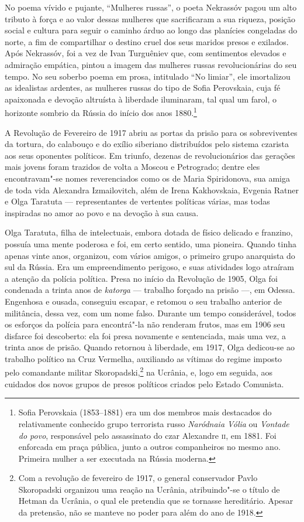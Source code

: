 No poema vívido e pujante, ``Mulheres russas'', o poeta Nekrassóv pagou
um alto tributo à força e ao valor dessas mulheres que sacrificaram a sua
riqueza, posição social e cultura para seguir o caminho árduo ao longo
das planícies congeladas do norte, a fim de compartilhar o destino cruel
dos seus maridos presos e exilados. Após Nekrassóv, foi a vez de Ivan
Turguêniev que, com sentimentos elevados e admiração empática, pintou a
imagem das mulheres russas revolucionárias do seu tempo. No seu soberbo
poema em prosa, intitulado ``No limiar'', ele imortalizou as idealistas
ardentes, as mulheres russas do tipo de Sofia Perovskaia, cuja fé
apaixonada e devoção altruísta à liberdade iluminaram, tal qual um
farol, o horizonte sombrio da Rússia do início dos anos
1880.\footnote{Sofia Perovskaia (1853--1881) era um dos membros mais
  destacados do relativamente conhecido grupo terrorista russo \textit{Naródnaia Vólia} ou \textit{Vontade do povo}, responsável pelo assassinato do czar
  Alexandre \textsc{ii}, em 1881. Foi enforcada em praça pública, junto a outros
  companheiros no mesmo ano. Primeira mulher a ser executada na
  Rússia moderna.}

A Revolução de Fevereiro de 1917 abriu as portas da prisão para os
sobreviventes da tortura, do calabouço e do exílio siberiano
distribuídos pelo sistema czarista aos seus oponentes políticos. Em
triunfo, dezenas de revolucionários das gerações mais jovens foram trazidos de volta a Moscou e Petrogrado;
dentre eles encontravam"-se
nomes reverenciados como os de Maria Spiridonova, sua amiga de toda vida
Alexandra Izmailovitch, além de Irena Kakhovskaia, Evgenia Ratner e Olga Taratuta
--- representantes de vertentes políticas várias, mas todas inspiradas no
amor ao povo e na devoção à sua causa.

Olga Taratuta, filha de intelectuais, embora dotada de físico delicado e franzino,
possuía uma mente poderosa e foi, em certo sentido, uma pioneira. Quando
tinha apenas vinte anos, organizou, com vários amigos, o primeiro grupo
anarquista do sul da Rússia. Era um empreendimento perigoso, e suas
atividades logo atraíram a atenção da polícia política. Presa no início
da Revolução de 1905, Olga foi condenada a trinta anos de \textit{katorga} --- trabalho
forçado na prisão ---, em Odessa. Engenhosa e ousada, conseguiu escapar, e
retomou o seu trabalho anterior de militância, dessa vez, com um nome falso. Durante
um tempo considerável, todos os esforços da polícia para encontrá"-la não
renderam frutos, mas em 1906 seu disfarce foi descoberto: ela foi presa
novamente e sentenciada, mais uma vez, a trinta anos de prisão. Quando
retornou à liberdade, em 1917, Olga dedicou-se ao trabalho político na
Cruz Vermelha, auxiliando as vítimas do regime imposto pelo comandante militar
Skoropadski,\footnote{Com a revolução de fevereiro de 1917, o general
  conservador Pavlo Skoropadski organizou uma reação na Ucrânia,
  atribuindo"-se o título de Hetman da Ucrânia, o qual ele pretendia que se tornasse
  hereditário. Apesar da pretensão, não se manteve no poder para além do ano de 1918.}
na Ucrânia, e, logo em seguida, aos cuidados dos novos grupos
de presos políticos criados pelo Estado Comunista.

